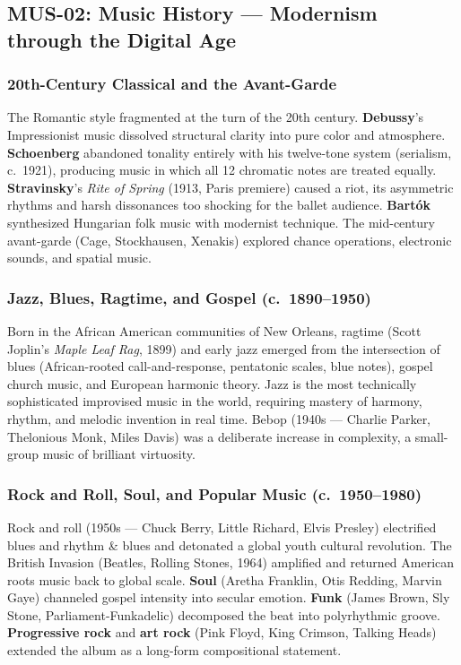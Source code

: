\documentclass[11pt,letterpaper]{article}
\begin{document}
\subsection{MUS-02: Music History --- Modernism through the Digital Age}

\subsubsection{20th-Century Classical and the Avant-Garde}

The Romantic style fragmented at the turn of the 20th century. \textbf{Debussy}'s Impressionist music dissolved structural clarity into pure color and atmosphere. \textbf{Schoenberg} abandoned tonality entirely with his twelve-tone system (serialism, c.~1921), producing music in which all 12 chromatic notes are treated equally. \textbf{Stravinsky}'s \emph{Rite of Spring} (1913, Paris premiere) caused a riot, its asymmetric rhythms and harsh dissonances too shocking for the ballet audience. \textbf{Bartók} synthesized Hungarian folk music with modernist technique. The mid-century avant-garde (Cage, Stockhausen, Xenakis) explored chance operations, electronic sounds, and spatial music.

\subsubsection{Jazz, Blues, Ragtime, and Gospel (c.~1890--1950)}

Born in the African American communities of New Orleans, ragtime (Scott Joplin's \emph{Maple Leaf Rag}, 1899) and early jazz emerged from the intersection of blues (African-rooted call-and-response, pentatonic scales, blue notes), gospel church music, and European harmonic theory. Jazz is the most technically sophisticated improvised music in the world, requiring mastery of harmony, rhythm, and melodic invention in real time. Bebop (1940s --- Charlie Parker, Thelonious Monk, Miles Davis) was a deliberate increase in complexity, a small-group music of brilliant virtuosity.

\subsubsection{Rock and Roll, Soul, and Popular Music (c.~1950--1980)}

Rock and roll (1950s --- Chuck Berry, Little Richard, Elvis Presley) electrified blues and rhythm \& blues and detonated a global youth cultural revolution. The British Invasion (Beatles, Rolling Stones, 1964) amplified and returned American roots music back to global scale. \textbf{Soul} (Aretha Franklin, Otis Redding, Marvin Gaye) channeled gospel intensity into secular emotion. \textbf{Funk} (James Brown, Sly Stone, Parliament-Funkadelic) decomposed the beat into polyrhythmic groove. \textbf{Progressive rock} and \textbf{art rock} (Pink Floyd, King Crimson, Talking Heads) extended the album as a long-form compositional statement.
\end{document}
